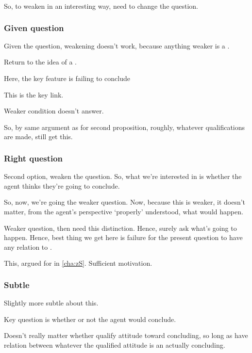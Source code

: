 \begin{note}
  So, to weaken in an interesting way, need to change the question.
\end{note}

\subsubsection{Given question}
\label{sec:given-question}

\begin{note}
  Given the question, weakening doesn't work, because anything weaker is a \requ{}.
\end{note}

\begin{note}
  Return to the idea of a \requ{}.

  Here, the key feature is failing to conclude

  This is the key link.

  Weaker condition doesn't answer.

  So, by same argument as for second proposition, roughly, whatever qualifications are made, still get this.
\end{note}

\subsubsection{Right question}
\label{sec:right-question}

\begin{note}
  Second option, weaken the question.
  So, what we're interested in is whether the agent thinks they're going to conclude.

  So, now, we're going the weaker question.
  Now, because this is weaker, it doesn't matter, from the agent's perspective `properly' understood, what would happen.

  Weaker question, then need this distinction.
  Hence, surely ask what's going to happen.
  Hence, best thing we get here is failure for the present question to have any relation to \qWhy{}.

  This, argued for in \autoref{cha:zS}.
  Sufficient motivation.
\end{note}

\subsubsection{Subtle}
\label{sec:subtle}


\begin{note}
  Slightly more subtle about this.

  Key question is whether or not the agent would conclude.

  Doesn't really matter whether qualify attitude toward concluding, so long as have relation between whatever the qualified attitude is an actually concluding.
\end{note}


